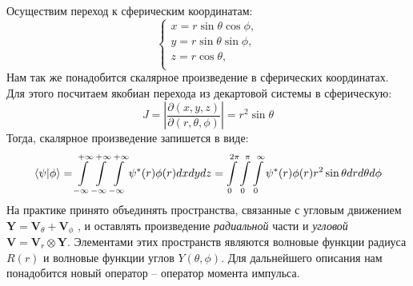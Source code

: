 Осуществим переход к сферическим координатам:
\[
\begin{cases}
x = r \sin \theta \cos \phi,\\
y = r \sin \theta \sin \phi, \\
z = r \cos \theta, \\
\end{cases}
\]
Нам так же понадобится скалярное произведение в сферических координатах. Для этого посчитаем якобиан перехода из декартовой системы в сферическую:
\[
J = \left|\frac{\partial(x, y, z)}{\partial(r, \theta, \phi)}\right| = r^2\sin\theta
\]
Тогда, скалярное произведение запишется в виде:
\[
\bra{\psi}\ket{\phi} = \int\limits_{-\infty}^{+\infty}\int\limits_{-\infty}^{+\infty}\int\limits_{-\infty}^{+\infty}\psi^*(r)\phi(r)dxdydz= \int\limits_0^{2\pi}\int\limits_0^{\pi}\int\limits_0^{\infty}\psi^*(r)\phi(r)r^2\sin\theta dr d\theta d\phi
\]
На практике принято объединять пространства, связанные с угловым движением $\mathbf{Y} = \mathbf{V}_{\theta} + \mathbf{V}_{\phi}$ , и оставлять произведение \textit{радиальной} части и \textit{угловой} $\mathbf{V} = \mathbf{V}_r \otimes \mathbf{Y}$. Элементами этих пространств являются волновые функции радиуса $R(r)$ и волновые функции углов $Y(\theta, \phi)$. Для дальнейшего описания нам понадобится новый оператор -- оператор момента импульса.
